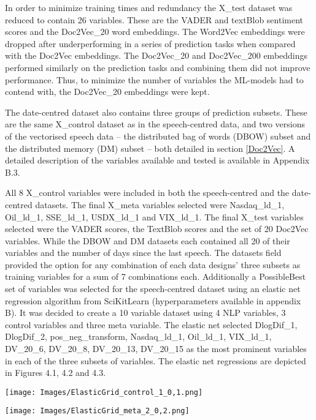 \documentclass[11pt,preprint, authoryear]{elsarticle}
\let\origfigure\figure
\let\endorigfigure\endfigure
\renewenvironment{figure}[1][2] {
    \expandafter\origfigure\expandafter[H]
} {
    \endorigfigure
}
\numberwithin{equation}{section}
\numberwithin{figure}{section}
\numberwithin{table}{section}
\begin{document}
In order to minimize training times and redundancy the X\_test dataset
was reduced to contain 26 variables. These are the VADER and textBlob
sentiment scores and the Doc2Vec\_20 word embeddings. The Word2Vec
embeddings were dropped after underperforming in a series of prediction
tasks when compared with the Doc2Vec embeddings. The Doc2Vec\_20 and
Doc2Vec\_200 embeddings performed similarly on the prediction tasks and
combining them did not improve performance. Thus, to minimize the number
of variables the ML-models had to contend with, the Doc2Vec\_20
embeddings were kept.

The date-centred dataset also contains three groups of prediction
subsets. These are the same X\_control dataset as in the speech-centred
data, and two versions of the vectorised speech data -- the distributed
bag of words (DBOW) subset and the distributed memory (DM) subset --
both detailed in section \ref{Doc2Vec}. A detailed description of the
variables available and tested is available in Appendix B.3.

All 8 X\_control variables were included in both the speech-centred and
the date-centred datasets. The final X\_meta variables selected were
Nasdaq\_ld\_1, Oil\_ld\_1, SSE\_ld\_1, USDX\_ld\_1 and VIX\_ld\_1. The
final X\_test variables selected were the VADER scores, the TextBlob
scores and the set of 20 Doc2Vec variables. While the DBOW and DM
datasets each contained all 20 of their variables and the number of days
since the last speech. The datasets field provided the option for any
combination of each data designs' three subsets as training variables
for a sum of 7 combinations each. Additionally a PossibleBest set of
variables was selected for the speech-centred dataset using an elastic
net regression algorithm from SciKitLearn (hyperparameters available in
appendix B). It was decided to create a 10 variable dataset using 4 NLP
variables, 3 control variables and three meta variable. The elastic net
selected DlogDif\_1, DlogDif\_2, pos\_neg\_transform, Nasdaq\_ld\_1,
Oil\_ld\_1, VIX\_ld\_1, DV\_20\_6, DV\_20\_8, DV\_20\_13, DV\_20\_15 as
the most prominent variables in each of the three subsets of variables.
The elastic net regressions are depicted in Figures 4.1, 4.2 and 4.3.

\begin{figure}
\centering
\texttt{[image: Images/ElasticGrid\_control\_1\_0,1.png]}
\caption{Elastic net: test set}
\end{figure}

\begin{figure}
\centering
\texttt{[image: Images/ElasticGrid\_meta\_2\_0,2.png]}
\caption{Elastic net: meta set}
\end{figure}
\end{document}
